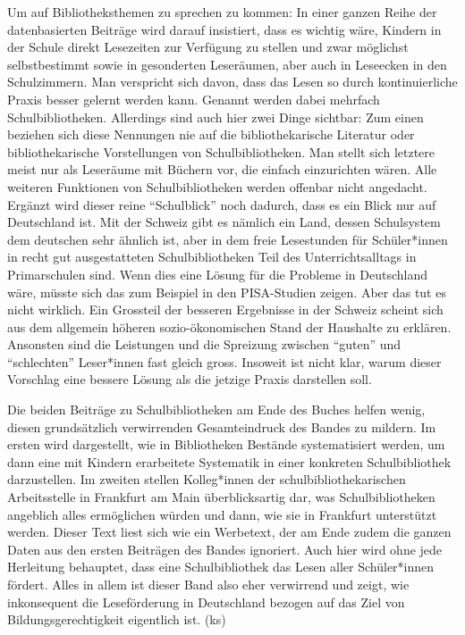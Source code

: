 \documentclass[a4paper,
fontsize=11pt,
oneside,
numbers=noperiodatend,
parskip=half-,
bibliography=totoc,
final
]{scrartcl}
\begin{document}
Um auf Bibliotheksthemen zu sprechen zu kommen: In einer ganzen Reihe
der datenbasierten Beiträge wird darauf insistiert, dass es wichtig
wäre, Kindern in der Schule direkt Lesezeiten zur Verfügung zu stellen
und zwar möglichst selbstbestimmt sowie in gesonderten Leseräumen, aber
auch in Leseecken in den Schulzimmern. Man verspricht sich davon, dass
das Lesen so durch kontinuierliche Praxis besser gelernt werden kann.
Genannt werden dabei mehrfach Schulbibliotheken. Allerdings sind auch
hier zwei Dinge sichtbar: Zum einen beziehen sich diese Nennungen nie
auf die bibliothekarische Literatur oder bibliothekarische Vorstellungen
von Schulbibliotheken. Man stellt sich letztere meist nur als Leseräume
mit Büchern vor, die einfach einzurichten wären. Alle weiteren
Funktionen von Schulbibliotheken werden offenbar nicht angedacht.
Ergänzt wird dieser reine \enquote{Schulblick} noch dadurch, dass es ein
Blick nur auf Deutschland ist. Mit der Schweiz gibt es nämlich ein Land,
dessen Schulsystem dem deutschen sehr ähnlich ist, aber in dem freie
Lesestunden für Schüler*innen in recht gut ausgestatteten
Schulbibliotheken Teil des Unterrichtsalltags in Primarschulen sind.
Wenn dies eine Lösung für die Probleme in Deutschland wäre, müsste sich
das zum Beispiel in den PISA-Studien zeigen. Aber das tut es nicht
wirklich. Ein Grossteil der besseren Ergebnisse in der Schweiz scheint
sich aus dem allgemein höheren sozio-ökonomischen Stand der Haushalte zu
erklären. Ansonsten sind die Leistungen und die Spreizung zwischen
\enquote{guten} und \enquote{schlechten} Leser*innen fast gleich gross.
Insoweit ist nicht klar, warum dieser Vorschlag eine bessere Lösung als
die jetzige Praxis darstellen soll.

Die beiden Beiträge zu Schulbibliotheken am Ende des Buches helfen
wenig, diesen grundsätzlich verwirrenden Gesamteindruck des Bandes zu
mildern. Im ersten wird dargestellt, wie in Bibliotheken Bestände
systematisiert werden, um dann eine mit Kindern erarbeitete Systematik
in einer konkreten Schulbibliothek darzustellen. Im zweiten stellen
Kolleg*innen der schulbibliothekarischen Arbeitsstelle in Frankfurt am
Main überblicksartig dar, was Schulbibliotheken angeblich alles
ermöglichen würden und dann, wie sie in Frankfurt unterstützt werden.
Dieser Text liest sich wie ein Werbetext, der am Ende zudem die ganzen
Daten aus den ersten Beiträgen des Bandes ignoriert. Auch hier wird ohne
jede Herleitung behauptet, dass eine Schulbibliothek das Lesen aller
Schüler*innen fördert. Alles in allem ist dieser Band also eher
verwirrend und zeigt, wie inkonsequent die Leseförderung in Deutschland
bezogen auf das Ziel von Bildungsgerechtigkeit eigentlich ist. (ks)
\end{document}
